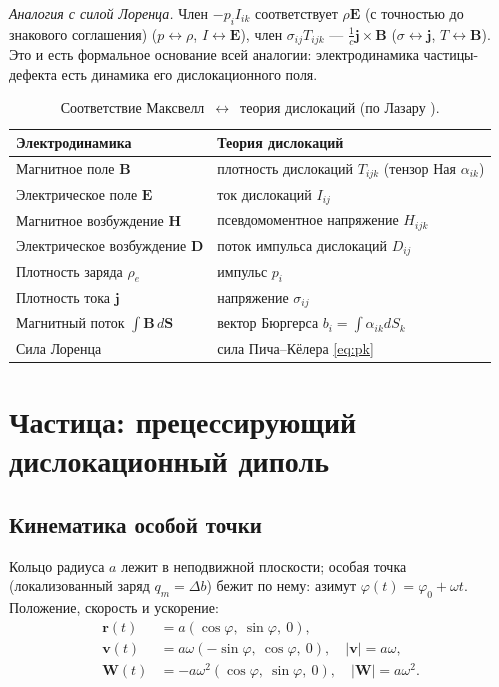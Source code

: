 \documentclass[12pt,a4paper]{article}
\begin{document}
\textit{Аналогия с силой Лоренца.} Член $-p_iI_{ik}$ соответствует $\rho\mathbf E$ (с точностью до знакового соглашения)
($p\leftrightarrow\rho$, $I\leftrightarrow\mathbf E$), член $\sigma_{ij}T_{ijk}$ ---
$\frac1c\mathbf j\times\mathbf B$ ($\sigma\leftrightarrow\mathbf j$,
$T\leftrightarrow\mathbf B$). Это и есть формальное основание всей аналогии:
электродинамика частицы-дефекта есть динамика его дислокационного поля.

\begin{table}[h]
\centering
\caption{Соответствие Максвелл~$\leftrightarrow$~теория дислокаций (по Лазару \cite{lazar2010,lazar2010pla}).}
\label{tab:corr}
\begin{tabular}{ll}
\toprule
Электродинамика & Теория дислокаций \\
\midrule
Магнитное поле $\mathbf{B}$ & плотность дислокаций $T_{ijk}$ (тензор Ная $\alpha_{ik}$) \\
Электрическое поле $\mathbf{E}$ & ток дислокаций $I_{ij}$ \\
Магнитное возбуждение $\mathbf{H}$ & псевдомоментное напряжение $H_{ijk}$ \\
Электрическое возбуждение $\mathbf{D}$ & поток импульса дислокаций $D_{ij}$ \\
Плотность заряда $\rho_e$ & импульс $p_i$ \\
Плотность тока $\mathbf j$ & напряжение $\sigma_{ij}$ \\
Магнитный поток $\int\mathbf{B}\,d\mathbf{S}$ & вектор Бюргерса $b_i=\int\alpha_{ik}dS_k$ \\
Сила Лоренца & сила Пича--Кёлера \eqref{eq:pk} \\
\bottomrule
\end{tabular}
\end{table}


\section{Частица: прецессирующий дислокационный диполь}

\subsection{Кинематика особой точки}
Кольцо радиуса $a$ лежит в неподвижной плоскости; особая точка (локализованный
заряд $q_m=\Delta b$) бежит по нему: азимут $\varphi(t)=\varphi_0+\omega t$.
Положение, скорость и ускорение:
\begin{align}
\mathbf{r}(t) &= a(\cos\varphi,\ \sin\varphi,\ 0),\\
\mathbf{v}(t) &= a\omega(-\sin\varphi,\ \cos\varphi,\ 0),\quad |\mathbf{v}|=a\omega,\\
\mathbf{W}(t) &= -a\omega^2(\cos\varphi,\ \sin\varphi,\ 0),\quad |\mathbf{W}|=a\omega^2.
\label{eq:accel}
\end{align}
\end{document}
